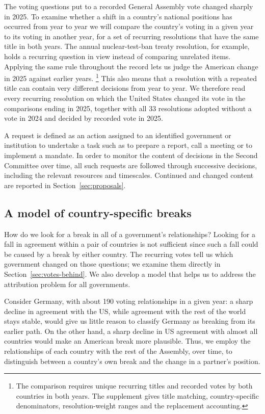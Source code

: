 \documentclass[12pt,authoryear]{elsarticle}
\begin{document}
The voting questions put to a recorded General Assembly vote changed sharply in 2025. To examine whether a shift in a country's national positions has occurred from year to year we will compare the country's voting in a given year to its voting in another year, for a set of recurring resolutions that have the same title in both years. The annual nuclear-test-ban treaty resolution, for example, holds a recurring question in view instead of comparing unrelated items. Applying the same rule throughout the record lets us judge the American change in 2025 against earlier years. \footnote{The comparison requires unique recurring titles and recorded votes by both countries in both years. The supplement gives title matching, country-specific denominators, resolution-weight ranges and the replacement accounting.} This also means that a resolution with a repeated title can contain very different decisions from year to year. We therefore read every recurring resolution on which the United States changed its vote in the comparisons ending in 2025, together with all 33 resolutions adopted without a vote in 2024 and decided by recorded vote in 2025.

A request is defined as an action assigned to an identified government or institution to undertake a task such as to prepare a report, call a meeting or to implement a mandate. In order to monitor the content of decisions in the Second Committee over time, all such requests are followed through successive decisions, including the relevant resources and timescales. Continued and changed content are reported in Section~\ref{sec:proposals}.

\subsection{A model of country-specific breaks}

How do we look for a break in all of a government's relationships? Looking for a fall in agreement within a pair of countries is not sufficient since such a fall could be caused by a break by either country. The recurring votes tell us which government changed on those questions; we examine them directly in Section~\ref{sec:votes-behind}. We also develop a model that helps us to address the attribution problem for all governments.

Consider Germany, with about 190 voting relationships in a given year: a sharp decline in agreement with the US, while agreement with the rest of the world stays stable, would give us little reason to classify Germany as breaking from its earlier path. On the other hand, a sharp decline in US agreement with almost all countries would make an American break more plausible. Thus, we employ the relationships of each country with the rest of the Assembly, over time, to distinguish between a country's own break and the change in a partner's position.
\end{document}
